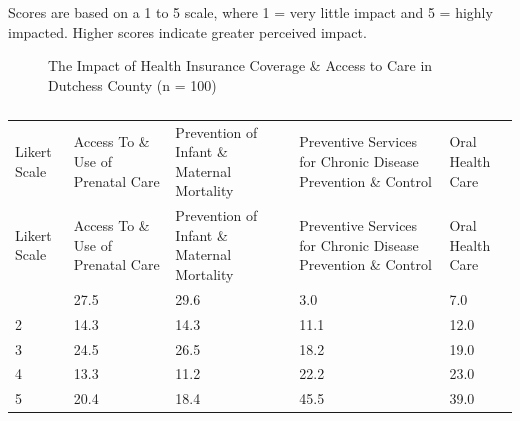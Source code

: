 \documentclass[
  english,
  letterpaper,
]{report}
\begin{document}
\begin{tcolorbox}[enhanced jigsaw, breakable, leftrule=.75mm, title=\textcolor{quarto-callout-note-color}{\faInfo}\hspace{0.5em}{Note}, bottomrule=.15mm, opacityback=0, left=2mm, colback=white, bottomtitle=1mm, coltitle=black, colbacktitle=quarto-callout-note-color!10!white, colframe=quarto-callout-note-color-frame, opacitybacktitle=0.6, toptitle=1mm, titlerule=0mm, arc=.35mm, rightrule=.15mm, toprule=.15mm]

Scores are based on a 1 to 5 scale, where 1 = very little impact and 5 =
highly impacted. Higher scores indicate greater perceived impact.

\end{tcolorbox}

\begin{figure}


\caption{\label{fig-dc-impact-hlthinsur-access}The Impact of Health
Insurance Coverage \& Access to Care in Dutchess County (n = 100)}

\end{figure}%

\begin{longtable}[]{@{}lllll@{}}

\caption{\label{tbl-dc-impact-hlthinsur-access}The Impact of Health
Insurance Coverage \& Access to Care in Dutchess County (n = 100)}

\tabularnewline

\caption{}\label{T_175e6}\tabularnewline
\toprule\noalign{}
Likert Scale & Access To \& Use of Prenatal Care & Prevention of Infant
\& Maternal Mortality & Preventive Services for Chronic Disease
Prevention \& Control & Oral Health Care \\
\midrule\noalign{}
\endfirsthead
\toprule\noalign{}
Likert Scale & Access To \& Use of Prenatal Care & Prevention of Infant
\& Maternal Mortality & Preventive Services for Chronic Disease
Prevention \& Control & Oral Health Care \\
\midrule\noalign{}
\endhead
\bottomrule\noalign{}
\endlastfoot
1 & 27.5 & 29.6 & 3.0 & 7.0 \\
2 & 14.3 & 14.3 & 11.1 & 12.0 \\
3 & 24.5 & 26.5 & 18.2 & 19.0 \\
4 & 13.3 & 11.2 & 22.2 & 23.0 \\
5 & 20.4 & 18.4 & 45.5 & 39.0 \\

\end{longtable}
\end{document}
